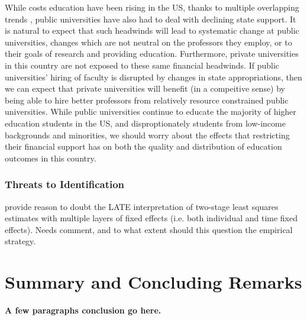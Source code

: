 \documentclass[notitlepage,12pt]{article}
\begin{document}
While costs education have been rising in the US, thanks to multiple overlapping trends \citep{ehrenberg2012}, public universities have also had to deal with declining state support.
It is natural to expect that such headwinds will lead to systematic change at public universities, changes which are not neutral on the professors they employ, or to their goals of research and providing education.
Furthermore, private universities in this country are not exposed to these same financial headwinds.
If public universities' hiring of faculty is disrupted by changes in state appropriations, then we can expect that private universities will benefit (in a compeitive sense) by being able to hire better professors from relatively resource constrained public universities.
While public universities continue to educate the majority of higher education students in the US, and disproptionately students from low-income backgrounds and minorities, we should worry about the effects that restricting their financial support has on both the quality and distribution of education outcomes in this country.


\subsubsection{Threats to Identification}

\cite{blandhol2022tsls} provide reason to doubt the LATE interpretation of two-stage least squares estimates with multiple layers of fixed effects (i.e. both individual and time fixed effects).
Needs comment, and to what extent should this question the empirical strategy.


\section{Summary and Concluding Remarks}
\label{sec:conclusion}

\textbf{A few paragraphs conclusion go here.} 






\appendix
\end{document}
